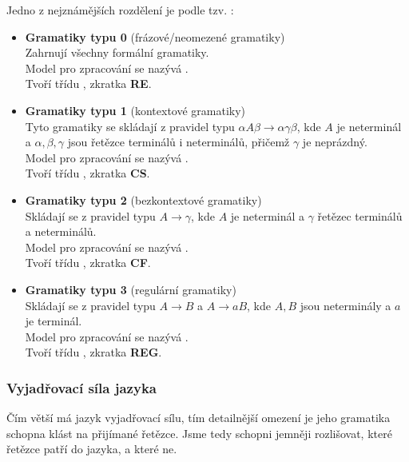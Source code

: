 \noindent
Jedno z nejznámějších rozdělení je podle tzv. :

\begin{itemize}
  \item \textbf{Gramatiky typu 0} (frázové/neomezené gramatiky)\\
  Zahrnují všechny formální gramatiky.\\
  Model pro zpracování se nazývá .\\
  Tvoří třídu , zkratka \textbf{RE}.

  \item \textbf{Gramatiky typu 1} (kontextové gramatiky)\\
  Tyto gramatiky se skládají z pravidel typu $\alpha A\beta \rightarrow \alpha \gamma \beta$,
  kde $A$ je neterminál a $\alpha, \beta, \gamma$ jsou řetězce terminálů i neterminálů,
  přičemž $\gamma$ je neprázdný.\\
  Model pro zpracování se nazývá .\\
  Tvoří třídu , zkratka \textbf{CS}.

  \item \textbf{Gramatiky typu 2} (bezkontextové gramatiky)\\
  Skládají se z pravidel typu $A \rightarrow \gamma$, kde $A$ je neterminál a
  $\gamma$ řetězec terminálů a neterminálů.\\
  Model pro zpracování se nazývá .\\
  Tvoří třídu , zkratka \textbf{CF}.

  \item \textbf{Gramatiky typu 3} (regulární gramatiky)\\
  Skládají se z pravidel typu $A \rightarrow B$ a $A \rightarrow aB$,
  kde $A, B$ jsou neterminály a $a$ je terminál.\\
  Model pro zpracování se nazývá .\\
  Tvoří třídu , zkratka \textbf{REG}.
\end{itemize}

\subsubsection*{Vyjadřovací síla jazyka}

Čím větší má jazyk vyjadřovací sílu, tím detailnější omezení je jeho
gramatika schopna klást na přijímané řetězce. Jsme tedy schopni jemněji rozlišovat,
které řetězce patří do jazyka, a které ne.

